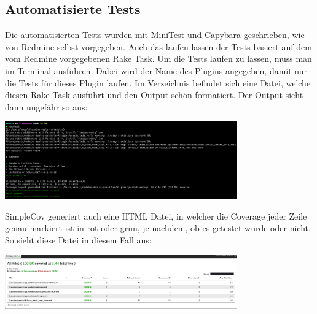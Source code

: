 \subsection{Automatisierte Tests}
\label{sec:automated-tests}
Die automatisierten Tests wurden mit MiniTest und Capybara geschrieben, wie von Redmine selbst
vorgegeben. Auch das laufen lassen der Tests basiert auf dem vom Redmine vorgegebenen Rake Task. Um die
Tests laufen zu lassen, muss man  im Terminal
ausführen. Dabei wird der Name des Plugins angegeben, damit nur die Tests für dieses Plugin laufen. Im
 Verzeichnis befindet sich eine  Datei, welche
diesen Rake Task ausführt und den Output schön formatiert.
Der Output sieht dann ungefähr so aus:
\begin{center}
    \includegraphics[width=0.75\textwidth]{images/misc/simplecov_terminal_output.png}
    \label{fig:simplecov_terminal_output}
\end{center}
SimpleCov generiert auch eine HTML Datei, in welcher die Coverage jeder Zeile genau markiert ist in
rot oder grün, je nachdem, ob es getestet wurde oder nicht. So sieht diese Datei in diesem Fall aus:
\begin{center}
    \includegraphics[width=0.75\textwidth]{images/misc/simplecov_html.png}
    \label{fig:simplecov_html_output}
\end{center}

